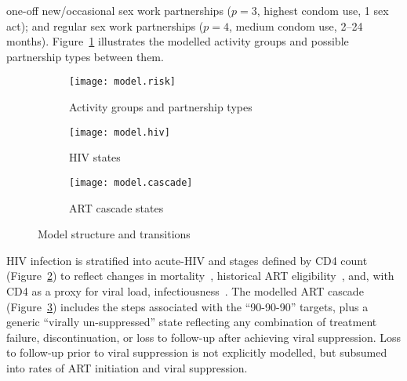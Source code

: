 one-off new/occasional sex work partnerships ($p=3$, highest condom use, 1 sex act);
and regular sex work partnerships ($p=4$, medium condom use, 2--24 months).
Figure~\ref{fig:model.risk} illustrates
the modelled activity groups and possible partnership types between them.
\begin{figure}
  \begin{subfigure}{\linewidth}
    \texttt{[image: model.risk]}
    \caption{Activity groups and partnership types}
    \label{fig:model.risk}
  \end{subfigure}
  \begin{subfigure}{\linewidth}
    \texttt{[image: model.hiv]}
    \caption{HIV states}
    \label{fig:model.hiv}
  \end{subfigure}
  \begin{subfigure}{\linewidth}
    \texttt{[image: model.cascade]}
    \caption{ART cascade states}
    \label{fig:model.cascade}
  \end{subfigure}
  \caption{Model structure and transitions}
  \label{fig:model}
\end{figure}
\par
HIV infection is stratified into
acute-HIV and stages defined by CD4 count (Figure~\ref{fig:model.hiv})
to reflect changes in mortality~\cite{Mangal2017},
historical ART eligibility~\cite{EswMOH2006,EswMOH2010,EswMOH2015,EswMOH2018},
and, with CD4 as a proxy for viral load, infectiousness~\cite{Boily2009}.
The modelled ART cascade (Figure~\ref{fig:model.cascade})
includes the steps associated with the ``90-90-90'' targets,
plus a generic ``virally un-suppressed'' state reflecting any combination of
treatment failure, discontinuation, or loss to follow-up after achieving viral suppression.
Loss to follow-up prior to viral suppression is not explicitly modelled,
but subsumed into rates of ART initiation and viral suppression.

